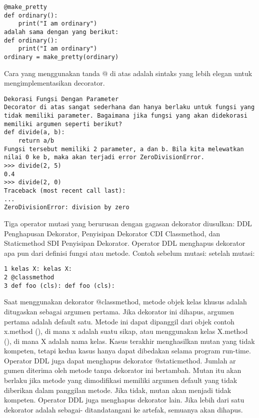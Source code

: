 \documentclass[12pt,a4paper]{article}
\begin{document}
\begin{verbatim}
@make_pretty
def ordinary():
    print("I am ordinary")
adalah sama dengan yang berikut:
def ordinary():
    print("I am ordinary")
ordinary = make_pretty(ordinary)
\end{verbatim}
Cara yang menggunakan tanda @ di atas adalah sintaks yang lebih elegan untuk mengimplementasikan decorator.

\begin{verbatim}
Dekorasi Fungsi Dengan Parameter
Decorator di atas sangat sederhana dan hanya berlaku untuk fungsi yang tidak memiliki parameter. Bagaimana jika fungsi yang akan didekorasi memiliki argumen seperti berikut?
def divide(a, b):
    return a/b
Fungsi tersebut memiliki 2 parameter, a dan b. Bila kita melewatkan nilai 0 ke b, maka akan terjadi error ZeroDivisionError.
>>> divide(2, 5)
0.4
>>> divide(2, 0)
Traceback (most recent call last):
...
ZeroDivisionError: division by zero
\end{verbatim}

Tiga operator mutasi yang berurusan dengan gagasan dekorator diusulkan: DDL
Penghapusan Dekorator, Penyisipan Dekorator CDI Classmethod, dan Staticmethod SDI
Penyisipan Dekorator.
Operator DDL menghapus dekorator apa pun dari definisi fungsi atau metode.
Contoh sebelum mutasi: setelah mutasi:
\begin{verbatim}
1 kelas X: kelas X:
2 @classmethod
3 def foo (cls): def foo (cls):
\end{verbatim}
Saat menggunakan dekorator @classmethod, metode objek kelas khusus adalah
ditugaskan sebagai argumen pertama. Jika dekorator ini dihapus, argumen pertama adalah default
satu. Metode ini dapat dipanggil dari objek contoh x.method (), di mana x adalah suatu
sikap, atau menggunakan kelas X.method (), di mana X adalah nama kelas. Kasus terakhir menghasilkan
mutan yang tidak kompeten, tetapi kedua kasus hanya dapat dibedakan selama program
run-time.
Operator DDL juga dapat menghapus dekorator @staticmethod. Jumlah ar
gumen diterima oleh metode tanpa dekorator ini bertambah. Mutan itu
akan berlaku jika metode yang dimodifikasi memiliki argumen default yang tidak diberikan dalam
panggilan metode. Jika tidak, mutan akan menjadi tidak kompeten.
Operator DDL juga menghapus dekorator lain. Jika lebih dari satu dekorator adalah sebagai-
ditandatangani ke artefak, semuanya akan dihapus.
\end{document}
